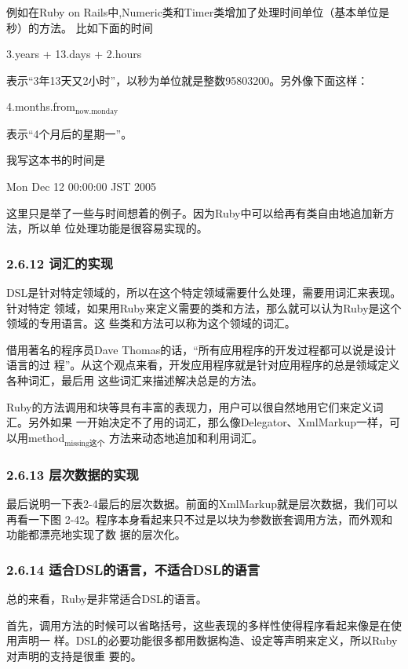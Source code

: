 \documentclass[11pt]{ctexart}
\begin{document}
例如在Ruby on Rails中,Numeric类和Timer类增加了处理时间单位（基本单位是秒）的方法。
比如下面的时间

3.years + 13.days + 2.hours

表示“3年13天又2小时”，以秒为单位就是整数95803200。另外像下面这样：

4.months.from\(_{\text{now.monday}}\)

表示“4个月后的星期一”。

我写这本书的时间是

Mon Dec 12 00:00:00 JST 2005

这里只是举了一些与时间想着的例子。因为Ruby中可以给再有类自由地追加新方法，所以单
位处理功能是很容易实现的。
\subsubsection{2.6.12 词汇的实现}
\label{sec:org2bfa0d0}

DSL是针对特定领域的，所以在这个特定领域需要什么处理，需要用词汇来表现。针对特定
领域，如果用Ruby来定义需要的类和方法，那么就可以认为Ruby是这个领域的专用语言。这
些类和方法可以称为这个领域的词汇。

借用著名的程序员Dave Thomas的话，“所有应用程序的开发过程都可以说是设计语言的过
程”。从这个观点来看，开发应用程序就是针对应用程序的总是领域定义各种词汇，最后用
这些词汇来描述解决总是的方法。

Ruby的方法调用和块等具有丰富的表现力，用户可以很自然地用它们来定义词汇。另外如果
一开始决定不了用的词汇，那么像Delegator、XmlMarkup一样，可以用method\(_{\text{missing这个}}\)
方法来动态地追加和利用词汇。
\subsubsection{2.6.13 层次数据的实现}
\label{sec:orge113905}

最后说明一下表2-4最后的层次数据。前面的XmlMarkup就是层次数据，我们可以再看一下图
2-42。程序本身看起来只不过是以块为参数嵌套调用方法，而外观和功能都漂亮地实现了数
据的层次化。
\subsubsection{2.6.14 适合DSL的语言，不适合DSL的语言}
\label{sec:org51b6fd4}

总的来看，Ruby是非常适合DSL的语言。

首先，调用方法的时候可以省略括号，这些表现的多样性使得程序看起来像是在使用声明一
样。DSL的必要功能很多都用数据构造、设定等声明来定义，所以Ruby对声明的支持是很重
要的。
\end{document}
